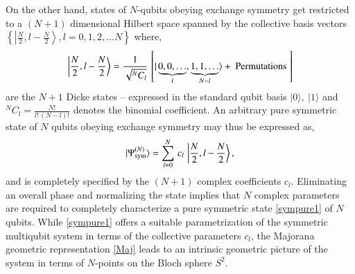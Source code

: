 On the other hand, states of $N$-qubits obeying exchange symmetry get restricted to a $(N+1)$ dimensional Hilbert space spanned by the collective basis vectors $\left\{\left\vert \frac{N}{2}, l-\frac{N}{2}\right\rangle, l=0,1,2,\ldots N \right\}$ where,
\begin{equation}
\left\vert \frac{N}{2}, l-\frac{N}{2}\right\rangle =\frac{1}{\sqrt{^N C_l}}\,\left[\vert \underbrace{0, 0, \ldots}_{l}, 
\underbrace{1, 1, \ldots}_{N-l}\rangle +\ {\rm Permutations}\ \right] \label{Dicke} 
\end{equation}
are the $N+1$ Dicke  states -- expressed in the standard qubit basis $\vert 0\rangle,\ \vert 1\rangle$ and $^N C_l=\frac{N!}{l!\,(N-l)!}$ denotes the binomial coefficient. An arbitrary pure symmetric state of $N$ qubits obeying exchange symmetry may thus be expressed as,    
\begin{equation}
\vert \Psi^{(N)}_{\rm sym}\rangle =\sum_{l=0}^{N}\, c_l\, \left\vert \frac{N}{2}, l-\frac{N}{2}\right\rangle,\label{sympure1}
\end{equation}
and is completely specified by the $(N+1)$ complex coefficients $c_l$.  Eliminating an overall phase and normalizing  the state  implies that $N$ complex parameters are required to completely characterize a pure symmetric state \eqref{sympure1} of $N$ qubits. While \eqref{sympure1} offers a suitable parametrization of the symmetric multiqubit system in terms of the collective parameters $c_l$, the Majorana geometric representation \eqref{Maj} leads to an intrinsic geometric picture of the  system in terms of $N$-points on the Bloch sphere $S^2$.  

